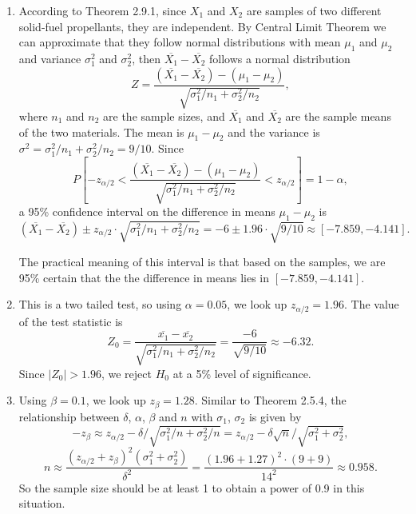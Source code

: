 \documentclass[11pt,a4paper]{article}
\begin{document}
\begin{enumerate}[label=\roman*)]
\item
According to Theorem 2.9.1, since $X_1$ and $X_2$ are samples of two different solid-fuel propellants, they are independent. By Central Limit Theorem we can approximate that they follow normal distributions with mean $\mu_1$ and $\mu_2$ and variance $\sigma_1^2$ and $\sigma_2^2$, then $\overline{X_1}-\overline{X_2}$ follows a normal distribution
$$Z=\frac{(\overline{X_1}-\overline{X_2})-(\mu_1-\mu_2)}{\sqrt{\sigma_1^2/n_1+\sigma_2^2/n_2}},$$ 
where $n_1$ and $n_2$ are the sample sizes, and $\overline{X_1}$ and $\overline{X_2}$ are the sample means of the two materials. The mean is $\mu_1-\mu_2$ and the variance is $\sigma^2=\sigma_1^2/n_1+\sigma_2^2/n_2=9/10$. Since
$$P\left[-z_{\alpha/2} < \frac{(\overline{X_1}-\overline{X_2})-(\mu_1-\mu_2)}{\sqrt{\sigma_1^2/n_1+\sigma_2^2/n_2}} < z_{\alpha/2} \right]=1-\alpha,$$
a 95\% confidence interval on the difference in means $\mu_1-\mu_2$ is
$$(\overline{X_1}-\overline{X_2})\pm z_{\alpha/2}\cdot \sqrt{\sigma_1^2/n_1+\sigma_2^2/n_2}=-6\pm1.96\cdot\sqrt{9/10}\approx[-7.859,-4.141].$$

The practical meaning of this interval is that based on the samples, we are 95\% certain that the the difference in means lies in $[-7.859,-4.141]$.
\item
This is a two tailed test, so using $\alpha=0.05$, we look up $z_{\alpha/2}=1.96$. The value of the test statistic is
$$Z_0=\frac{\overline{x_1}-\overline{x_2}}{\sqrt{\sigma_1^2/n_1+\sigma_2^2/n_2}}=\frac{-6}{\sqrt{9/10}}\approx-6.32.$$
Since $|Z_0|>1.96$, we reject $H_0$ at a 5\% level of significance.
\item
Using $\beta=0.1$, we look up $z_\beta=1.28$. Similar to Theorem 2.5.4, the relationship between $\delta$, $\alpha$, $\beta$ and $n$ with $\sigma_1$, $\sigma_2$ is given by
$$-z_\beta\approx z_{\alpha/2}-\delta/\sqrt{\sigma_1^2/n+\sigma_2^2/n}=z_{\alpha/2}-\delta\sqrt{n}/\sqrt{\sigma_1^2+\sigma_2^2},$$
$$n\approx\frac{(z_{\alpha/2}+z_\beta)^2(\sigma_1^2+\sigma_2^2)}{\delta^2}=\frac{(1.96+1.27)^2\cdot(9+9)}{14^2}\approx0.958.$$
So the sample size should be at least 1 to obtain a power of 0.9 in this situation.
\end{enumerate}
\end{document}
